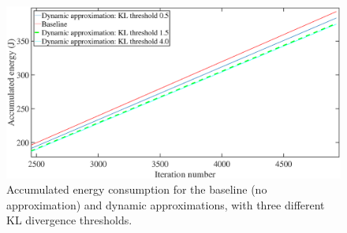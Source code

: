 \begin{figure}[tb]
  \centering
  \includegraphics[width=1\columnwidth]{img/Energy_cropped.eps}
  \caption{Accumulated energy consumption for the baseline (no approximation) and dynamic approximations, with three different KL divergence thresholds.}
  \label{fig:Energy_res_acc}
\end{figure}